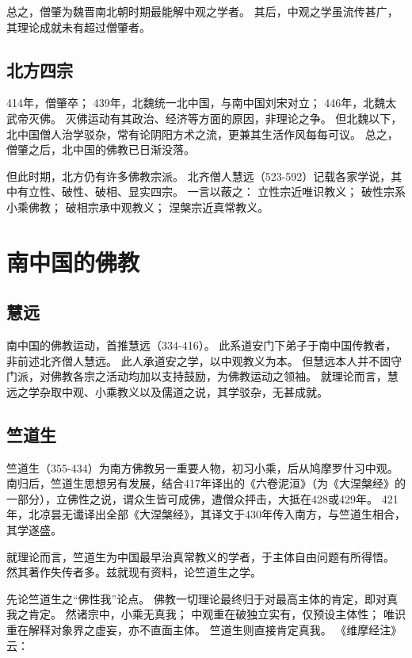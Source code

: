\documentclass[11pt]{article}
\begin{document}
\par

总之，僧肇为魏晋南北朝时期最能解中观之学者。
其后，中观之学虽流传甚广，其理论成就未有超过僧肇者。

\subsection{北方四宗}
414年，僧肇卒；
439年，北魏统一北中国，与南中国刘宋对立；
446年，北魏太武帝灭佛。
灭佛运动有其政治、经济等方面的原因，非理论之争。
但北魏以下，北中国僧人治学驳杂，常有论阴阳方术之流，更兼其生活作风每每可议。
总之，僧肇之后，北中国的佛教已日渐没落。

\par

但此时期，北方仍有许多佛教宗派。
北齐僧人慧远（523-592）记载各家学说，其中有立性、破性、破相、显实四宗。
一言以蔽之：
立性宗近唯识教义；
破性宗系小乘佛教；
破相宗承中观教义；
涅槃宗近真常教义。

\section{南中国的佛教}
\subsection{慧远}
南中国的佛教运动，首推慧远（334-416）。
此系道安门下弟子于南中国传教者，非前述北齐僧人慧远。
此人承道安之学，以中观教义为本。
但慧远本人并不固守门派，对佛教各宗之活动均加以支持鼓励，为佛教运动之领袖。
就理论而言，慧远之学杂取中观、小乘教义以及儒道之说，其学驳杂，无甚成就。

\subsection{竺道生}
竺道生（355-434）为南方佛教另一重要人物，初习小乘，后从鸠摩罗什习中观。
南归后，竺道生思想另有发展，结合417年译出的《六卷泥洹》（为《大涅槃经》的一部分），立佛性之说，谓众生皆可成佛，遭僧众抨击，大抵在428或429年。
421年，北凉昙无谶译出全部《大涅槃经》，其译文于430年传入南方，与竺道生相合，其学遂盛。

\par

就理论而言，竺道生为中国最早治真常教义的学者，于主体自由问题有所得悟。
然其著作失传者多。兹就现有资料，论竺道生之学。

\par

先论竺道生之“佛性我”论点。
佛教一切理论最终归于对最高主体的肯定，即对真我之肯定。
然诸宗中，小乘无真我；
中观重在破独立实有，仅预设主体性；
唯识重在解释对象界之虚妄，亦不直面主体。
竺道生则直接肯定真我。
《维摩经注》云：
\end{document}
